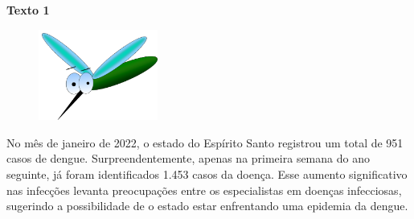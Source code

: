 \begin{myquote}






\textbf{Texto 1}

\begin{figure}  %
  \centering
  \includegraphics[width=0.35\textwidth]{./imgSAEB_7_POR/media/image32.png}
\end{figure} %

No mês de janeiro de 2022, o estado do Espírito Santo registrou um
total de 951 casos de dengue. Surpreendentemente, apenas na primeira semana do
ano seguinte, já foram identificados 1.453 casos da doença. Esse aumento
significativo nas infecções levanta preocupações entre os especialistas em
doenças infecciosas, sugerindo a possibilidade de o estado estar enfrentando
uma epidemia da dengue.


\end{myquote}

